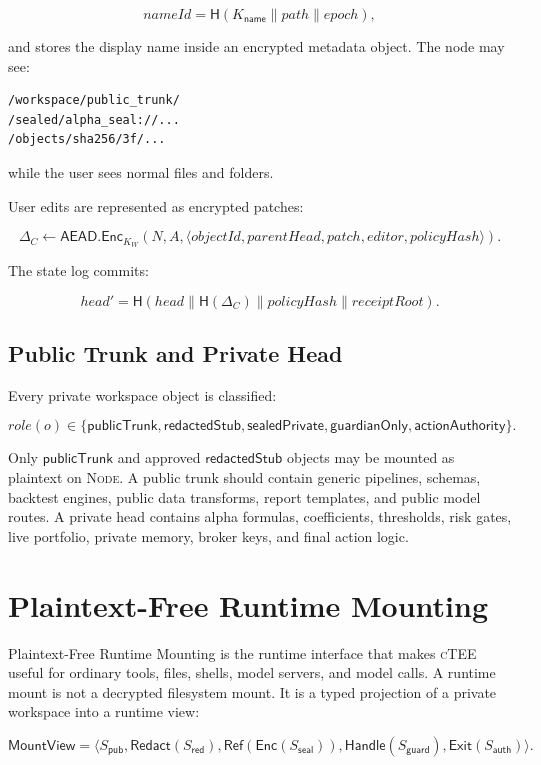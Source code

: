 \documentclass[11pt]{article}
\newcommand{\ctee}{\textnormal{\textsc{cTEE}}}
\newcommand{\roletext}[1]{\textnormal{\textsc{#1}}\xspace}
\newcommand{\node}{\ifmmode\mathsf{Node}\else\roletext{Node}\fi}
\newcommand{\aead}{\ensuremath{\mathsf{AEAD}}}
\newcommand{\enc}{\ensuremath{\mathsf{Enc}}}
\newcommand{\hash}{\ensuremath{\mathsf{H}}}
\begin{document}
\[
nameId = \hash(K_{\mathsf{name}} \parallel path \parallel epoch),
\]

\noindent and stores the display name inside an encrypted metadata object.
The node may see:

\begin{Verbatim}[fontsize=\small]
/workspace/public_trunk/
/sealed/alpha_seal://...
/objects/sha256/3f/...
\end{Verbatim}

\noindent while the user sees normal files and folders.

User edits are represented as encrypted patches:

\[
\Delta_C \leftarrow \aead.\enc_{K_W}(N, A,
  \langle objectId, parentHead, patch, editor, policyHash\rangle).
\]

The state log commits:

\[
head' = \hash(head \parallel \hash(\Delta_C) \parallel policyHash
\parallel receiptRoot).
\]

\subsection{Public Trunk and Private Head}

Every private workspace object is classified:

\[
role(o) \in \{\mathsf{publicTrunk}, \mathsf{redactedStub},
\mathsf{sealedPrivate}, \mathsf{guardianOnly}, \mathsf{actionAuthority}\}.
\]

Only \(\mathsf{publicTrunk}\) and approved \(\mathsf{redactedStub}\) objects may
be mounted as plaintext on \node. A public trunk should contain generic
pipelines, schemas, backtest engines, public data transforms, report templates,
and public model routes. A private head contains alpha formulas, coefficients,
thresholds, risk gates, live portfolio, private memory, broker keys, and final
action logic.

\section{Plaintext-Free Runtime Mounting}

Plaintext-Free Runtime Mounting is the runtime interface that makes \ctee{}
useful for ordinary tools, files, shells, model servers, and model calls. A
runtime mount is not a decrypted filesystem mount. It is a typed projection of
a private workspace into a runtime view:

\[
\mathsf{MountView} =
\langle
S_{\mathsf{pub}},
\mathsf{Redact}(S_{\mathsf{red}}),
\mathsf{Ref}(\enc(S_{\mathsf{seal}})),
\mathsf{Handle}(S_{\mathsf{guard}}),
\mathsf{Exit}(S_{\mathsf{auth}})
\rangle .
\]
\end{document}
